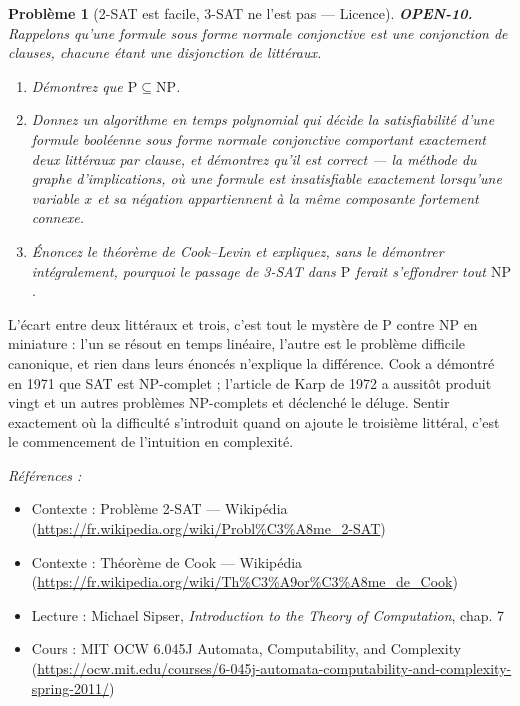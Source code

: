 \documentclass[11pt]{article}
\newtheorem{problem}{Problème}
\newenvironment{refs}{\par\small\noindent\emph{Références :}\begin{itemize}\setlength\itemsep{0pt}}{\end{itemize}\normalsize}
\begin{document}
\begin{problem}[{2-SAT est facile, 3-SAT ne l'est pas --- Licence}]
\textbf{OPEN-10.} Rappelons qu'une formule sous forme normale conjonctive est une
conjonction de clauses, chacune étant une disjonction de littéraux.
\begin{enumerate}
\item[(a)] Démontrez que $ \mathrm{P} \subseteq \mathrm{NP} $.
\item[(b)] Donnez un algorithme en temps polynomial qui décide la satisfiabilité d'une formule
booléenne sous forme normale conjonctive comportant exactement deux littéraux par clause,
et démontrez qu'il est correct --- la méthode du graphe d'implications, où une formule est
insatisfiable exactement lorsqu'une variable $ x $ et sa négation appartiennent à la
même composante fortement connexe.
\item[(c)] Énoncez le théorème de Cook--Levin et expliquez, sans le démontrer intégralement,
pourquoi le passage de 3-SAT dans $ \mathrm{P} $ ferait s'effondrer tout
$ \mathrm{NP} $.
\end{enumerate}

\end{problem}

\noindent L'écart entre deux littéraux et trois, c'est tout le mystère de
$ \mathrm{P} $ contre $ \mathrm{NP} $ en miniature : l'un se résout en temps linéaire,
l'autre est le problème difficile canonique, et rien dans leurs énoncés n'explique la
différence. Cook a démontré en 1971 que SAT est NP-complet ; l'article de Karp de 1972 a
aussitôt produit vingt et un autres problèmes NP-complets et déclenché le déluge. Sentir
exactement où la difficulté s'introduit quand on ajoute le troisième littéral, c'est le
commencement de l'intuition en complexité.

\begin{refs}
\item Contexte : Problème 2-SAT --- Wikipédia (\url{https://fr.wikipedia.org/wiki/Probl%C3%A8me_2-SAT})
\item Contexte : Théorème de Cook --- Wikipédia (\url{https://fr.wikipedia.org/wiki/Th%C3%A9or%C3%A8me_de_Cook})
\item Lecture : Michael Sipser, \textit{Introduction to the Theory of Computation}, chap. 7
\item Cours : MIT OCW 6.045J Automata, Computability, and Complexity (\url{https://ocw.mit.edu/courses/6-045j-automata-computability-and-complexity-spring-2011/})
\end{refs}
\end{document}
